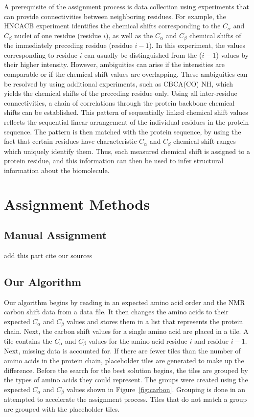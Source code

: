 \documentclass[12pt]{article}
\begin{document}
A prerequisite of the assignment process is data collection using experiments that can provide connectivities between neighboring residues. For example, the HNCACB experiment identifies the chemical shifts corresponding to the $C_\alpha$ and $C_{\beta}$ nuclei of one residue (residue $i$), as well as the $C_\alpha$ and $C_{\beta}$ chemical shifts of the immediately preceding residue (residue $i -1$). In this experiment, the values corresponding to residue $i$ can usually be distinguished from the ($i -1$) values by their higher intensity. However, ambiguities can arise if the intensities are comparable or if the chemical shift values are overlapping. These ambiguities can be resolved by using additional experiments, such as CBCA(CO) NH, which yields the chemical shifts of the preceding residue only. Using all inter-residue connectivities, a chain of correlations through the protein backbone chemical shifts can be established.  This pattern of sequentially linked chemical shift values reflects the sequential linear arrangement of the individual residues in the protein sequence. The pattern is then matched with the protein sequence, by using the fact that certain residues have characteristic $C_\alpha$ and $C_{\beta}$ chemical shift ranges which uniquely identify them. Thus, each measured chemical shift is assigned to a protein residue, and this information can then be used to infer structural information about the biomolecule.

\section{Assignment Methods} %
\label{sec:method}

\subsection{Manual Assignment} %
\label{sub:manual_assignment}
add this part
cite our sources


\subsection{Our Algorithm} %
\label{sub:algorithm}
Our algorithm begins by reading in an expected amino acid order and the NMR carbon shift data from a data file. It then changes the amino acids to their expected $C_\alpha$ and $C_{\beta}$ values and stores them in a list that represents the protein chain. Next, the carbon shift values for a single amino acid are placed in a tile. A tile contains the $C_\alpha$ and $C_{\beta}$ values for the amino acid residue $i$ and residue $i-1$. Next, missing data is accounted for. If there are fewer tiles than the number of amino acids in the protein chain, placeholder tiles are generated to make up the difference. Before the search for the best solution begins, the tiles are grouped by the types of amino acids they could represent. The groups were created using the expected $C_\alpha$ and $C_{\beta}$ values shown in Figure~\ref{fig:carbon}. Grouping is done in an attempted to accelerate the assignment process. Tiles that do not match a group are grouped with the placeholder tiles. 
\end{document}
